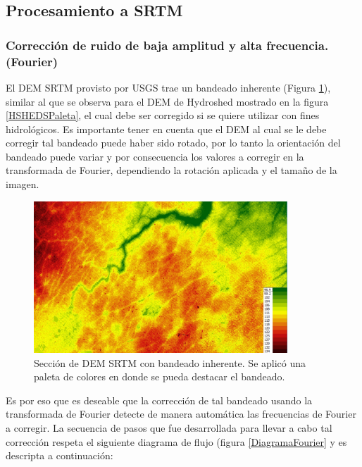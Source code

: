 \documentclass[10pt,a4paper, twoside]{report}
\begin{document}
\subsection{Procesamiento a SRTM}

\subsubsection{Corrección de ruido de baja amplitud y alta frecuencia. (Fourier)}
\label{correccionfourier}



El DEM SRTM provisto por USGS trae un bandeado inherente (Figura \ref{SinFourier}), similar al que se observa para el DEM de Hydroshed mostrado en la figura \ref{HSHEDSPaleta}, el cual debe ser corregido si se quiere utilizar con fines hidrológicos. Es importante tener en cuenta que el DEM al cual se le debe corregir tal bandeado puede haber sido rotado, por lo tanto la orientación del bandeado puede variar y por consecuencia los valores a corregir en la transformada de Fourier, dependiendo la rotación aplicada y el tamaño de la imagen.

\begin{figure}[!htb]
   \centering      
   \includegraphics[width=0.85\textwidth]{imagenes/SRTMSinFourier.jpg}
 \caption{Sección de DEM SRTM con bandeado inherente. Se aplicó una paleta de colores en donde se pueda destacar el bandeado.}
 \label{SinFourier}
\end{figure}


Es por eso que es deseable que la corrección de tal bandeado usando la transformada de Fourier detecte de manera automática las frecuencias de Fourier a corregir. La secuencia de pasos que fue desarrollada para llevar a cabo tal corrección respeta el siguiente diagrama de flujo (figura \ref{DiagramaFourier} y es descripta a continuación:
\end{document}
